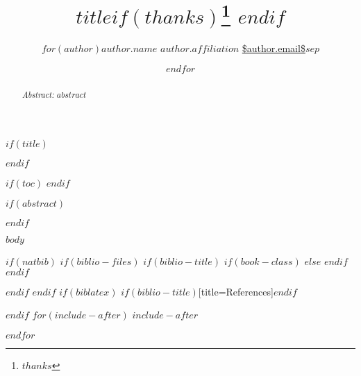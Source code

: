 \documentclass[11pt,article,oneside]{memoir}
\title{\bigskip \bigskip $title$$if(thanks)$\thanks{$thanks$} $endif$ }
\author{$for(author)$\Large $author.name$\vspace{0.05in} \newline\normalsize\emph{$author.affiliation$} \newline\footnotesize \url{$author.email$}\vspace*{0.2in}\newline $sep$ \and $endfor$}
\date{}
\begin{document}
  
	\pagestyle{kjh}
	
	
	$if(title)$
	\maketitle
	$endif$
	
	$if(toc)$
	{
		\hypersetup{linkcolor=black}
		\setcounter{tocdepth}{$toc-depth$}
		\tableofcontents
	}
	$endif$
	
	$if(abstract)$
	
	\begin{abstract}
		
		\vspace*{-0.75in}\noindent \emph{Abstract:} $abstract$
		
	\end{abstract}
	
	$endif$
	
	$body$
	
	$if(natbib)$
	$if(biblio-files)$
	$if(biblio-title)$
	$if(book-class)$
	\renewcommand\bibname{Bibliography}
	$else$
	\renewcommand\refname{References}
	$endif$
	$endif$
	
	
	
	$endif$
	$endif$
	$if(biblatex)$
	\printbibliography$if(biblio-title)$[title=References]$endif$
	
	$endif$
	$for(include-after)$
	$include-after$
	
	$endfor$
\end{document}
